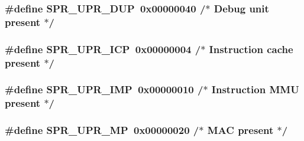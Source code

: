 \hypertarget{spr-defs_8h_a4843ed545e07cd231ad415c9240ed662}{
\subsubsection[{\-S\-P\-R\-\_\-\-U\-P\-R\-\_\-\-D\-U\-P}]{\setlength{\rightskip}{0pt plus 5cm}\#define {\bf \-S\-P\-R\-\_\-\-U\-P\-R\-\_\-\-D\-U\-P}~0x00000040  /$\ast$ Debug unit present $\ast$/}}\label{spr-defs_8h_a4843ed545e07cd231ad415c9240ed662}
\hypertarget{spr-defs_8h_accfc87b8e38b65e09f29c96fe112b72c}{
\subsubsection[{\-S\-P\-R\-\_\-\-U\-P\-R\-\_\-\-I\-C\-P}]{\setlength{\rightskip}{0pt plus 5cm}\#define {\bf \-S\-P\-R\-\_\-\-U\-P\-R\-\_\-\-I\-C\-P}~0x00000004  /$\ast$ Instruction cache present $\ast$/}}\label{spr-defs_8h_accfc87b8e38b65e09f29c96fe112b72c}
\hypertarget{spr-defs_8h_ace8a8f949e50da852cd8f8ea632a1964}{
\subsubsection[{\-S\-P\-R\-\_\-\-U\-P\-R\-\_\-\-I\-M\-P}]{\setlength{\rightskip}{0pt plus 5cm}\#define {\bf \-S\-P\-R\-\_\-\-U\-P\-R\-\_\-\-I\-M\-P}~0x00000010  /$\ast$ Instruction M\-M\-U present $\ast$/}}\label{spr-defs_8h_ace8a8f949e50da852cd8f8ea632a1964}
\hypertarget{spr-defs_8h_a69d6a1144fcf649a10180b8f4768d75c}{
\subsubsection[{\-S\-P\-R\-\_\-\-U\-P\-R\-\_\-\-M\-P}]{\setlength{\rightskip}{0pt plus 5cm}\#define {\bf \-S\-P\-R\-\_\-\-U\-P\-R\-\_\-\-M\-P}~0x00000020  /$\ast$ M\-A\-C present $\ast$/}}\label{spr-defs_8h_a69d6a1144fcf649a10180b8f4768d75c}
